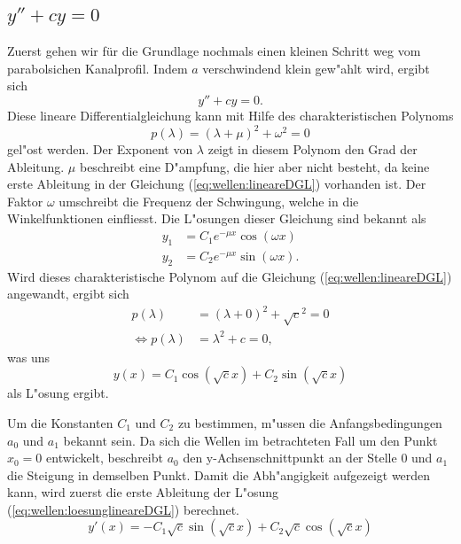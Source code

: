 \subsection{\texorpdfstring{$y''+cy = 0$}{y''+cy = 0}}
Zuerst gehen wir für die Grundlage nochmals einen kleinen Schritt weg vom 
parabolsichen Kanalprofil. Indem $a$ verschwindend klein gew"ahlt wird, ergibt 
sich
\begin{equation}
	y''+ cy = 0.
	\label{eq:wellen:lineareDGL}
\end{equation}
Diese lineare Differentialgleichung kann mit Hilfe des charakteristischen 
Polynoms
\begin{equation*}
	p(\lambda) = (\lambda+\mu)^2+\omega^2 = 0
\end{equation*}
gel"ost werden. Der Exponent von $\lambda$ zeigt in diesem Polynom den Grad der 
Ableitung. $\mu$ beschreibt eine D"ampfung, die hier aber nicht besteht, da 
keine erste Ableitung in der Gleichung (\ref{eq:wellen:lineareDGL}) vorhanden 
ist. Der Faktor $\omega$ umschreibt die Frequenz der Schwingung, welche in die 
Winkelfunktionen einfliesst. Die L"osungen dieser Gleichung sind bekannt als
\begin{equation*}
	\begin{split}
		y_1 &= C_1e^{-\mu x}\cos(\omega x) \\
		y_2 &= C_2e^{-\mu x}\sin(\omega x).
	\end{split}
\end{equation*}
Wird dieses charakteristische Polynom auf die Gleichung 
(\ref{eq:wellen:lineareDGL}) angewandt, ergibt sich
\begin{equation*}
	\begin{split}
		p(\lambda) &= (\lambda+0)^2+\sqrt{c}^2 = 0 \\
		\Leftrightarrow p(\lambda) &= \lambda^2+c = 0,
	\end{split}
\end{equation*}
was uns
\begin{equation}
	y(x) = C_1 \cos(\sqrt{c}x) + C_2 \sin(\sqrt{c}x)
	\label{eq:wellen:loesunglineareDGL}
\end{equation}
als L"osung ergibt.

Um die Konstanten $C_1$ und $C_2$ zu bestimmen, m"ussen die Anfangsbedingungen 
$a_0$ und $a_1$ bekannt sein. Da sich die Wellen im betrachteten Fall um den 
Punkt $x_0=0$ entwickelt, beschreibt $a_0$ den y-Achsenschnittpunkt an 
der Stelle $0$ und $a_1$ die Steigung in demselben Punkt. Damit die 
Abh"angigkeit aufgezeigt werden kann, wird zuerst die erste Ableitung der 
L"osung (\ref{eq:wellen:loesunglineareDGL}) berechnet.
\begin{equation}
	y'(x)=-C_1 \sqrt{c} \sin(\sqrt{c}x) + C_2 \sqrt{c} \cos(\sqrt{c}x)
\end{equation}

